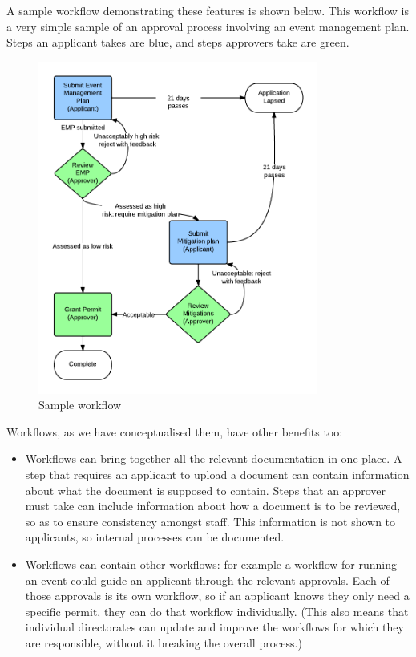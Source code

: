 \documentclass[12pt]{article}
\begin{document}
A sample workflow demonstrating these features is shown below. This workflow
is a very simple sample of an approval process involving an event
management plan. Steps an applicant takes are blue, and steps approvers
take are green.

\begin{figure}[htbp]
\centering
\includegraphics[width=0.82\textwidth]{./imgs/sample-workflow.png}
\caption{Sample workflow}
\end{figure}
\newpage
Workflows, as we have conceptualised them, have other benefits too: 
\begin{itemize}
\item Workflows can bring together all the relevant documentation in
  one place. A step that requires an applicant to upload a document
  can contain information about what the document is supposed to
  contain.  Steps that an approver must take can include information
  about how a document is to be reviewed, so as to ensure consistency
  amongst staff.  This information is not shown to applicants, so
  internal processes can be documented. 
\item Workflows can contain other workflows: for example a workflow
  for running an event could guide an applicant through the relevant
  approvals. Each of those approvals is its own workflow, so if an
  applicant knows they only need a specific permit, they can do that
  workflow individually. (This also means that individual directorates
  can update and improve the workflows for which they are responsible,
  without it breaking the overall process.)
\end{itemize}
\end{document}
